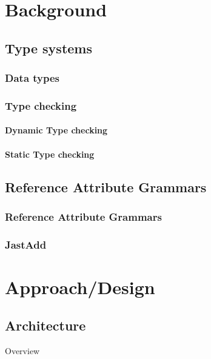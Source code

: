 \documentclass[nofilelist]{cslthse-msc}
\begin{document}
\chapter{Background}
\section{Type systems}
\subsection{Data types}
\subsection{Type checking}
\subsubsection{Dynamic Type checking}
\subsubsection{Static Type checking}
\section{Reference Attribute Grammars}
\subsection{Reference Attribute Grammars}
\subsection{JastAdd}

\chapter{Approach/Design} %

\section{Architecture}
Overview
\end{document}
